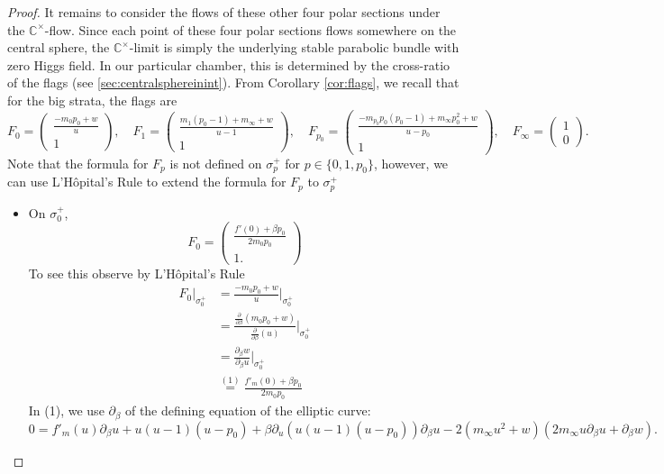 \documentclass[12pt,letterpaper,reqno]{amsart}
\def\mathbf#1{#1}%
\theoremstyle{remark}
\theoremstyle{definition}
\numberwithin{thm}{section}
\numberwithin{equation}{section}
\numberwithin{figure}{section}
\newcommand{\C}{\ensuremath{\mathbb C}}
\begin{document}
\begin{proof}
It remains to consider the flows of these other four polar sections under the $\C^\times$-flow.  Since each point of these four polar sections flows somewhere on the central sphere, the $\C^\times$-limit is simply the underlying stable parabolic bundle with zero Higgs field. In our particular chamber, this is determined by the cross-ratio of the flags (see \ref{sec:centralsphereinint}).
From Corollary \ref{cor:flags}, we recall that for the big strata, the flags are    \begin{equation*}
    F_0 = \begin{pmatrix} \frac{-m_0 p_0 +w}{u} \\ 1 \end{pmatrix}, \quad 
      F_1 = 
  \begin{pmatrix} \frac{m_1(p_0-1) + m_\infty +w}{u-1} \\ 1 \end{pmatrix}, \quad 
        F_{p_0} = \begin{pmatrix} \frac{-m_{p_0} p_0(p_0-1) + m_\infty p_0^2 +w}{u-p_0}\\ 1 \end{pmatrix}, \quad 
          F_\infty = \begin{pmatrix} 1\\ 0 \end{pmatrix}.
   \end{equation*}
   Note that the formula for $F_p$ is not defined on $\sigma^+_p$ for $p \in \{0, 1, p_0\}$, however, we can use L'H\^{o}pital's Rule to extend the formula for $F_p$ to $\sigma^+_p$
\begin{itemize}
\item On $\sigma^+_0$, \[
F_0 = \begin{pmatrix} \frac{f'(0) + \beta p_0}{2 m_0 p_0} \\ 1.\end{pmatrix}
\]
To see this observe by L'H\^{o}pital's Rule
\begin{align*} F_0\Big|_{\sigma^+_0} &= \frac{-m_0 p_0 + w}{u}\Big|_{\sigma^+_0} \\
& =\frac{\frac{\partial}{\partial \beta}(m_0 p_0 + w)}{\frac{\partial}{\partial \beta}(u)}\Big|_{\sigma^+_0}\\
&=\frac{\partial_\beta w}{\partial_\beta u} \Big|_{\sigma^+_0}\\
&\overset{(1)}{=}\frac{f'_{\mathbf{m}}(0)  + \beta p_0}{2m_0 p_0}
\end{align*}
In (1), we use $\partial_\beta$ of the defining equation of the elliptic curve:
\[ 0=f'_{\mathbf{m}}(u) \partial_\beta u + u(u-1)(u-p_0)+\beta \partial_u \left( u(u-1)(u-p_0) \right) \partial_\beta u -2 (m_\infty u^2 + w)( 2 m_\infty u \partial_\beta u + \partial_\beta w).\]

\end{itemize}
\end{proof}
\end{document}
